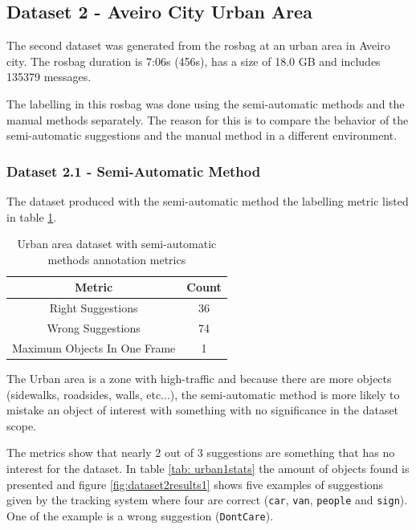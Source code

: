 \subsection{Dataset 2 - Aveiro City Urban Area}

The second dataset was generated from the rosbag at an urban area in Aveiro city. The rosbag duration is 7:06s (456s), has a size of 18.0 GB and includes 135379 messages. 

The labelling in this rosbag was done using the semi-automatic methods and the manual methods separately. The reason for this is to compare the behavior of the semi-automatic suggestions and the manual method in a different environment.

\subsubsection{Dataset 2.1 - Semi-Automatic Method}

The dataset produced with the semi-automatic method the labelling metric listed in table \ref{tab: urban1metrics}.

\begin{table}[htp]
	\centering
	\caption{Urban area dataset with semi-automatic methods annotation metrics}
	\label{tab: urban1metrics}
	\begin{tabular}{c|c}
		\textbf{Metric}              & \textbf{Count} \\ \hline
		Right Suggestions            & 36                      \\ \hline
		Wrong Suggestions            & 74                      \\ \hline
		Maximum Objects In One Frame & 1                      
	\end{tabular}
\end{table}

The Urban area is a zone with high-traffic and because there are more objects (sidewalks, roadsides, walls, etc...), the semi-automatic method is more likely to mistake an object of interest with something with no significance in the dataset scope. 

The metrics show that nearly 2 out of 3 suggestions are something that has no interest for the dataset. In table \ref{tab: urban1stats} the amount of objects found is presented and figure \ref{fig:dataset2results1} shows five examples of suggestions given by the tracking system where four are correct (\texttt{car}, \texttt{van}, \texttt{people} and \texttt{sign}). One of the example is a wrong suggestion (\texttt{DontCare}).

